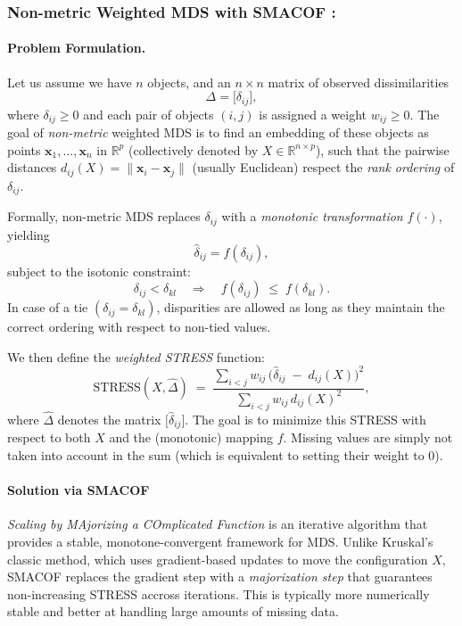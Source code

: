 \subsubsection*{Non-metric Weighted MDS with SMACOF \cite{smacof}:}
\paragraph{Problem Formulation.} Let us assume we have $n$ objects, and an $n\times n$ matrix of observed dissimilarities 
\[
\Delta = \bigl[\delta_{ij}\bigr],
\]
where $\delta_{ij} \ge 0$ and each pair of objects $(i,j)$ is assigned a weight $w_{ij}\ge 0$. The goal of \emph{non-metric} weighted MDS is to find an embedding of these objects as points $\mathbf{x}_1,\dots,\mathbf{x}_n$ in $\mathbb{R}^p$ (collectively denoted by $X \in \mathbb{R}^{n\times p}$), such that the pairwise distances $d_{ij}(X) = \|\mathbf{x}_i - \mathbf{x}_j\|$ (usually Euclidean) respect the \emph{rank ordering} of $\delta_{ij}$.

Formally, non-metric MDS replaces $\delta_{ij}$ with a \emph{monotonic transformation} $f(\cdot)$, yielding
\[
\hat{\delta}_{ij} = f(\delta_{ij}),
\]
subject to the isotonic constraint:
\[
\delta_{ij} < \delta_{kl} 
\quad \Longrightarrow \quad 
f(\delta_{ij}) \;\le\; f(\delta_{kl}).
\]
In case of a tie $(\delta_{ij} = \delta_{kl} )$, disparities are allowed as long as they maintain the correct ordering with respect to non-tied values.

We then define the \emph{weighted STRESS} function:
\begin{equation}
\mathrm{STRESS}(X,\hat{\Delta}) 
\;=\;
\frac{\sum_{i<j} w_{ij}\,\bigl(\hat{\delta}_{ij} \;-\; d_{ij}(X)\bigr)^2}{\sum_{i<j} w_{ij}\,d_{ij}(X)^2},
\label{eq:stress}
\end{equation}
where $\hat{\Delta}$ denotes the matrix $\bigl[\hat{\delta}_{ij}\bigr]$.  
The goal is to minimize this STRESS with respect to both $X$ and the (monotonic) mapping $f$. Missing values are simply not taken into account in the sum (which is equivalent to setting their weight to 0).

\paragraph{Solution via SMACOF}\label{sec:smacof-solution}
\emph{Scaling by MAjorizing a COmplicated Function} is an iterative algorithm that provides a stable, monotone-convergent framework for MDS. Unlike Kruskal's classic method, which uses gradient-based updates to move the configuration $X$, SMACOF replaces the gradient step with a \emph{majorization step} that guarantees non-increasing STRESS accross iterations. This is typically more numerically stable and better at handling large amounts of missing data.

